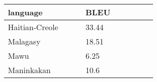\begin{tabular}{p{0.3\linewidth}p{0.3\linewidth}}
	\toprule
	language & BLEU \\
	\toprule
	Haitian-Creole & 33.44 \\
	Malagasy & 18.51 \\
	Mawu & 6.25 \\ Maninkakan  & 10.6 \\
	\bottomrule
\end{tabular}